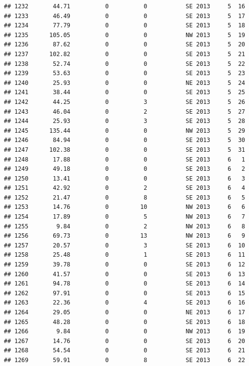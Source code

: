 \documentclass[
]{article}
\begin{document}
\begin{verbatim}
## 1232       44.71          0          0           SE 2013     5  16
## 1233       46.49          0          0           SE 2013     5  17
## 1234       77.79          0          0           SE 2013     5  18
## 1235      105.05          0          0           NW 2013     5  19
## 1236       87.62          0          0           SE 2013     5  20
## 1237      102.82          0          0           SE 2013     5  21
## 1238       52.74          0          0           SE 2013     5  22
## 1239       53.63          0          0           SE 2013     5  23
## 1240       25.93          0          0           NE 2013     5  24
## 1241       38.44          0          0           SE 2013     5  25
## 1242       44.25          0          3           SE 2013     5  26
## 1243       46.04          0          2           SE 2013     5  27
## 1244       25.93          0          3           SE 2013     5  28
## 1245      135.44          0          0           NW 2013     5  29
## 1246       84.94          0          0           SE 2013     5  30
## 1247      102.38          0          0           SE 2013     5  31
## 1248       17.88          0          0           SE 2013     6   1
## 1249       49.18          0          0           SE 2013     6   2
## 1250       13.41          0          0           SE 2013     6   3
## 1251       42.92          0          2           SE 2013     6   4
## 1252       21.47          0          8           SE 2013     6   5
## 1253       14.76          0         10           NW 2013     6   6
## 1254       17.89          0          5           NW 2013     6   7
## 1255        9.84          0          2           NW 2013     6   8
## 1256       69.73          0         13           NW 2013     6   9
## 1257       20.57          0          3           SE 2013     6  10
## 1258       25.48          0          1           SE 2013     6  11
## 1259       39.78          0          0           SE 2013     6  12
## 1260       41.57          0          0           SE 2013     6  13
## 1261       94.78          0          0           SE 2013     6  14
## 1262       97.91          0          0           SE 2013     6  15
## 1263       22.36          0          4           SE 2013     6  16
## 1264       29.05          0          0           NE 2013     6  17
## 1265       48.28          0          0           SE 2013     6  18
## 1266        9.84          0          0           NW 2013     6  19
## 1267       14.76          0          0           SE 2013     6  20
## 1268       54.54          0          0           SE 2013     6  21
## 1269       59.91          0          8           SE 2013     6  22

\end{verbatim}
\end{document}
